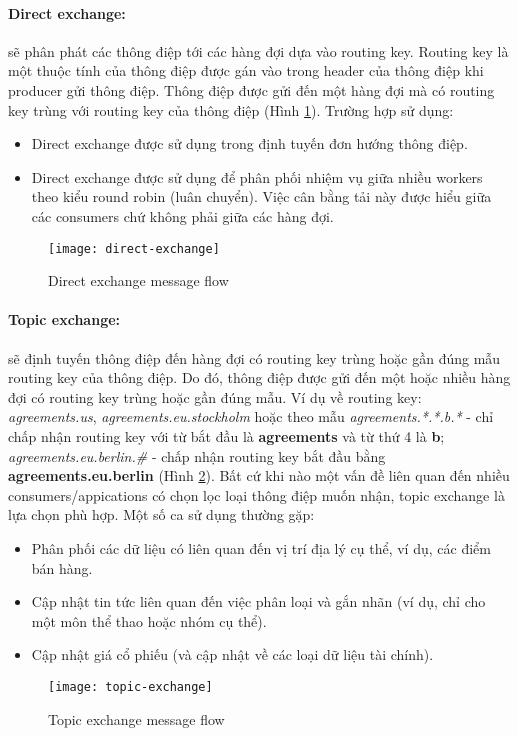 \paragraph{Direct exchange:} sẽ phân phát các thông điệp tới các hàng đợi dựa vào routing key. Routing key là một thuộc tính của thông điệp được gán vào trong header của thông điệp khi producer gửi thông điệp. Thông điệp được gửi đến một hàng đợi mà có routing key trùng với routing key của thông điệp (Hình \ref{fig:directExchange}). Trường hợp sử dụng:
\begin{itemize}
  \item Direct exchange được sử dụng trong định tuyến đơn hướng thông điệp.
  \item Direct exchange được sử dụng để phân phối nhiệm vụ giữa nhiều workers theo kiểu round robin (luân chuyển). Việc cân bằng tải này được hiểu giữa các consumers chứ không phải giữa các hàng đợi.
\end{itemize}

\begin{figure}[h]
    \centering
    \texttt{[image: direct-exchange]}
    \caption{Direct exchange message flow}
    \label{fig:directExchange}
\end{figure}


\paragraph{Topic exchange:} sẽ định tuyến thông điệp đến hàng đợi có routing key trùng hoặc gần đúng mẫu routing key của thông điệp. Do đó, thông điệp được gửi đến một hoặc nhiều hàng đợi có routing key trùng hoặc gần đúng mẫu. Ví dụ về routing key: \textit{agreements.us}, \textit{agreements.eu.stockholm} hoặc theo mẫu \textit{agreements.*.*.b.*} - chỉ chấp nhận routing key với từ bắt đầu là \textbf{agreements} và từ thứ 4 là \textbf{b}; \textit{agreements.eu.berlin.\#} - chấp nhận routing key bắt đầu bằng \textbf{agreements.eu.berlin} (Hình \ref{fig:topicExchange}). Bất cứ khi nào một vấn đề liên quan đến nhiều consumers/appications có chọn lọc loại thông điệp muốn nhận, topic exchange là lựa chọn phù hợp. Một số ca sử dụng thường gặp: 
\begin{itemize}
	\item Phân phối các dữ liệu có liên quan đến vị trí địa lý cụ thể, ví dụ, các điểm bán hàng.
	\item Cập nhật tin tức liên quan đến việc phân loại và gắn nhãn (ví dụ, chỉ cho một môn thể thao hoặc nhóm cụ thể).
	\item Cập nhật giá cổ phiếu (và cập nhật về các loại dữ liệu tài chính).
\end{itemize}
\begin{figure}[h]
    \centering
    \texttt{[image: topic-exchange]}
    \caption{Topic exchange message flow}
    \label{fig:topicExchange}
\end{figure}

